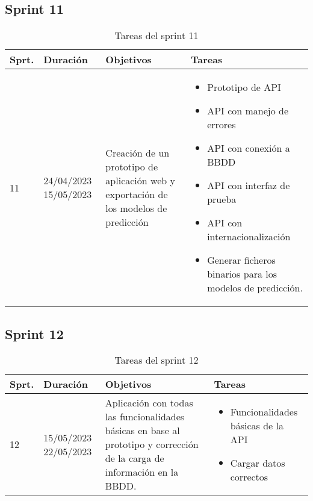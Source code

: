 
\subsection{Sprint 11}

\begin{table}[h]
\centering
\begin{tabularx}{\textwidth}{llll}
\toprule
\textbf{Sprt.} & \textbf{Duración} & \textbf{Objetivos} & \textbf{Tareas}\\
\midrule
    11 & \parbox{55}{24/04/2023 15/05/2023} & \parbox{80}{Creación de un prototipo de aplicación web y exportación de los modelos de predicción} & \parbox{150}{\begin{itemize}\item Prototipo de API \item API con manejo de errores \item API con conexión a BBDD \item API con interfaz de prueba \item API con internacionalización \item Generar ficheros binarios para los modelos de predicción.\end{itemize}}\\
\bottomrule
\end{tabularx}
\caption{Tareas del sprint 11}
\label{tab:sprint11}
\end{table}


\subsection{Sprint 12}

\begin{table}[h]
\centering
\begin{tabularx}{\textwidth}{llll}
\toprule
\textbf{Sprt.} & \textbf{Duración} & \textbf{Objetivos} & \textbf{Tareas}\\
\midrule
    12 & \parbox{55}{15/05/2023 22/05/2023} & \parbox{80}{Aplicación con todas las funcionalidades básicas en base al prototipo y corrección de la carga de información en la BBDD.} & \parbox{150}{\begin{itemize}\item Funcionalidades básicas de la API \item Cargar datos correctos\end{itemize}}\\
\bottomrule
\end{tabularx}
\caption{Tareas del sprint 12}
\label{tab:sprint12}
\end{table}
 
